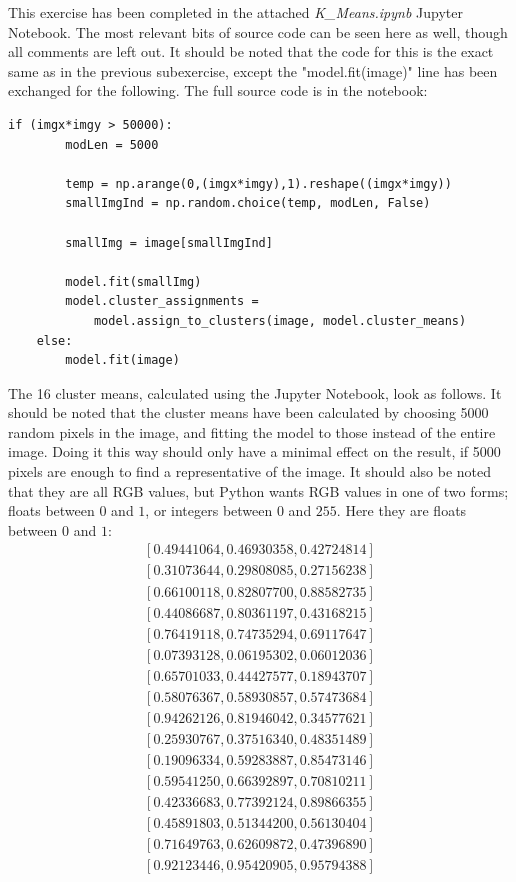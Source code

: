 This exercise has been completed in the attached \textit{K\_Means.ipynb} Jupyter Notebook. The most relevant bits of source code can be seen here as well, though all comments are left out. It should be noted that the code for this is the exact same as in the previous subexercise, except the "model.fit(image)" line has been exchanged for the following. The full source code is in the notebook:
\begin{verbatim}
if (imgx*imgy > 50000):
        modLen = 5000

        temp = np.arange(0,(imgx*imgy),1).reshape((imgx*imgy))
        smallImgInd = np.random.choice(temp, modLen, False)
        
        smallImg = image[smallImgInd]

        model.fit(smallImg)
        model.cluster_assignments = 
            model.assign_to_clusters(image, model.cluster_means)
    else:
        model.fit(image)
\end{verbatim}
The 16 cluster means, calculated using the Jupyter Notebook, look as follows. It should be noted that the cluster means have been calculated by choosing 5000 random pixels in the image, and fitting the model to those instead of the entire image. Doing it this way should only have a minimal effect on the result, if 5000 pixels are enough to find a representative of the image. It should also be noted that they are all RGB values, but Python wants RGB values in one of two forms; floats between $0$ and $1$, or integers between $0$ and $255$. Here they are floats between $0$ and $1$:
$$
\begin{matrix}
[0.49441064, 0.46930358, 0.42724814] \\[3pt]
[0.31073644, 0.29808085, 0.27156238] \\[3pt]
[0.66100118, 0.82807700, 0.88582735] \\[3pt]
[0.44086687, 0.80361197, 0.43168215] \\[3pt]
[0.76419118, 0.74735294, 0.69117647] \\[3pt]
[0.07393128, 0.06195302, 0.06012036] \\[3pt]
[0.65701033, 0.44427577, 0.18943707] \\[3pt]
[0.58076367, 0.58930857, 0.57473684] \\[3pt]
[0.94262126, 0.81946042, 0.34577621] \\[3pt]
[0.25930767, 0.37516340, 0.48351489] \\[3pt]
[0.19096334, 0.59283887, 0.85473146] \\[3pt]
[0.59541250, 0.66392897, 0.70810211] \\[3pt]
[0.42336683, 0.77392124, 0.89866355] \\[3pt]
[0.45891803, 0.51344200, 0.56130404] \\[3pt]
[0.71649763, 0.62609872, 0.47396890] \\[3pt]
[0.92123446, 0.95420905, 0.95794388]
\end{matrix}
$$
